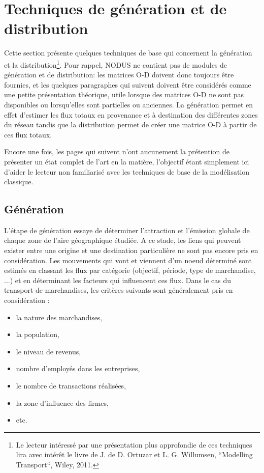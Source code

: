 \section{Techniques de g\'en\'eration et de distribution}

Cette section présente quelques techniques de
base qui concernent la génération et la distribution\footnote{Le lecteur
intéressé par une présentation plus approfondie de ces techniques lira avec
intérêt le livre de J. de D. Ortuzar et L. G. Willumsen, ``Modelling
Transport``, Wiley, 2011.}. Pour rappel, NODUS ne contient pas de modules de
génération et de distribution: les matrices O-D doivent donc toujours être
fournies, et les quelques paragraphes qui suivent doivent être considérés comme
une petite présentation théorique, utile lorsque des matrices O-D ne sont pas
disponibles ou lorsqu'elles sont partielles ou anciennes. La génération permet
en effet d'estimer les flux totaux en provenance et à destination des
différentes zones du réseau tandis que la distribution permet de créer une
matrice O-D à partir de ces flux totaux.

Encore une fois, les pages qui suivent n'ont aucunement la prétention de
présenter un état complet de l'art en la matière, l'objectif étant simplement
ici d'aider le lecteur non familiarisé avec les techniques de base de la
modélisation classique.

\subsection{G\'en\'eration}

L'étape de génération essaye de déterminer l'attraction et l'émission globale de
chaque zone de l'aire géographique étudiée. A ce stade, les liens qui peuvent
exister entre une origine et une destination particulière ne sont pas encore
pris en considération. Les mouvements qui vont et viennent d'un noeud déterminé
sont estimés en classant les flux par catégorie (objectif, période, type de
marchandise, ...) et en déterminant les facteurs qui influencent ces flux. Dans
le cas du transport de marchandises, les critères suivants sont généralement
pris en considé\-ration :

\begin{itemize}
\item la nature des marchandises,
\item la population,
\item le niveau de revenus,
\item nombre d'employés dans les entreprises,
\item le nombre de transactions réalisées,
\item la zone d'influence des firmes,
\item etc.
\end{itemize}

